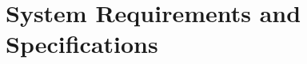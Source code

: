 \documentclass[../MasterThesis.tex]{subfiles}
\begin{document}
	
	
	

%
%
%
%
%
%
%
%
\newpage
\section{System Requirements and Specifications} \label{section:systemrequirementsandspecifications}














\end{document}
